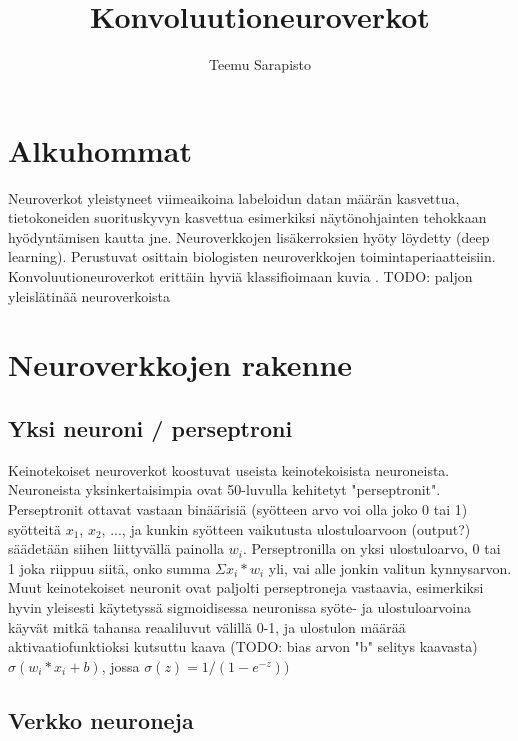 \documentclass[11pt]{article}
\theoremstyle{plain}
\theoremstyle{definition}
\begin{document}
  \title{Konvoluutioneuroverkot}
  \author{Teemu Sarapisto}
  \maketitle

  \section{Alkuhommat}

  Neuroverkot yleistyneet viimeaikoina labeloidun datan määrän kasvettua, tietokoneiden suorituskyvyn kasvettua esimerkiksi näytönohjainten tehokkaan hyödyntämisen kautta jne. Neuroverkkojen lisäkerroksien hyöty löydetty (deep learning). Perustuvat osittain biologisten neuroverkkojen toimintaperiaatteisiin. Konvoluutioneuroverkot erittäin hyviä klassifioimaan kuvia \cite{Goodfellow-et-al-2016}. TODO: paljon yleislätinää neuroverkoista


  \section{Neuroverkkojen rakenne}
  \subsection{Yksi neuroni / perseptroni}

   Keinotekoiset neuroverkot koostuvat useista keinotekoisista neuroneista. Neuroneista yksinkertaisimpia ovat 50-luvulla kehitetyt "perseptronit". Perseptronit ottavat vastaan binäärisiä (syötteen arvo voi olla joko 0 tai 1) syötteitä $x_1$, $x_2$, ..., ja kunkin syötteen vaikutusta ulostuloarvoon (output?) säädetään siihen liittyvällä painolla $w_i$. Perseptronilla on yksi ulostuloarvo, 0 tai 1 joka riippuu siitä, onko summa $\Sigma x_i * w_i$ yli, vai alle jonkin valitun kynnysarvon. Muut keinotekoiset neuronit ovat paljolti perseptroneja vastaavia, esimerkiksi hyvin yleisesti käytetyssä sigmoidisessa neuronissa syöte- ja ulostuloarvoina käyvät mitkä tahansa reaaliluvut välillä 0-1, ja ulostulon määrää aktivaatiofunktioksi kutsuttu kaava (TODO: bias arvon "b" selitys kaavasta) $\sigma(w_i*x_i + b)$, jossa $\sigma(z) = 1/(1-e^{-z}))$\cite{Nielsen-neural}

   \subsection{Verkko neuroneja}
\end{document}
